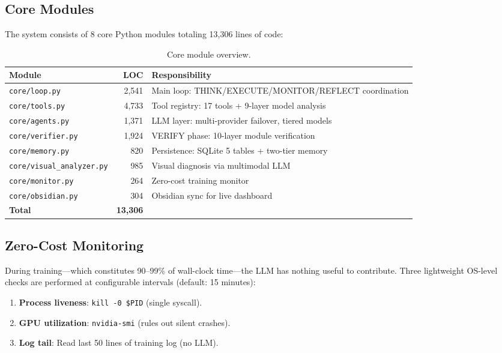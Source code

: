 \documentclass[11pt,a4paper]{article}
\newcommand{\toolname}[1]{\texttt{#1}}
\begin{document}
\subsection{Core Modules}

The system consists of 8 core Python modules totaling 13,306 lines of code:

\begin{table}[h]
\centering
\begin{threeparttable}
\caption{Core module overview.}
\label{tab:modules}
\begin{tabularx}{\linewidth}{l r X}
\toprule
\textbf{Module} & \textbf{LOC} & \textbf{Responsibility} \\
\midrule
\toolname{core/loop.py}      & 2,541 & Main loop: THINK/EXECUTE/MONITOR/REFLECT coordination \\
\toolname{core/tools.py}     & 4,733 & Tool registry: 17 tools + 9-layer model analysis \\
\toolname{core/agents.py}    & 1,371 & LLM layer: multi-provider failover, tiered models \\
\toolname{core/verifier.py}  & 1,924 & VERIFY phase: 10-layer module verification \\
\toolname{core/memory.py}    &   820 & Persistence: SQLite 5 tables + two-tier memory \\
\toolname{core/visual\_analyzer.py} & 985 & Visual diagnosis via multimodal LLM \\
\toolname{core/monitor.py}   &   264 & Zero-cost training monitor \\
\toolname{core/obsidian.py}  &   304 & Obsidian sync for live dashboard \\
\midrule
\textbf{Total} & \textbf{13,306} & \\
\bottomrule
\end{tabularx}
\end{threeparttable}
\end{table}

\subsection{Zero-Cost Monitoring}

During training---which constitutes 90--99\% of wall-clock time---the LLM has nothing useful to contribute.
Three lightweight OS-level checks are performed at configurable intervals (default: 15 minutes):

\begin{enumerate}[nosep]
\item \textbf{Process liveness}: \toolname{kill -0 \$PID} (single syscall).
\item \textbf{GPU utilization}: \toolname{nvidia-smi} (rules out silent crashes).
\item \textbf{Log tail}: Read last 50 lines of training log (no LLM).
\end{enumerate}
\end{document}
